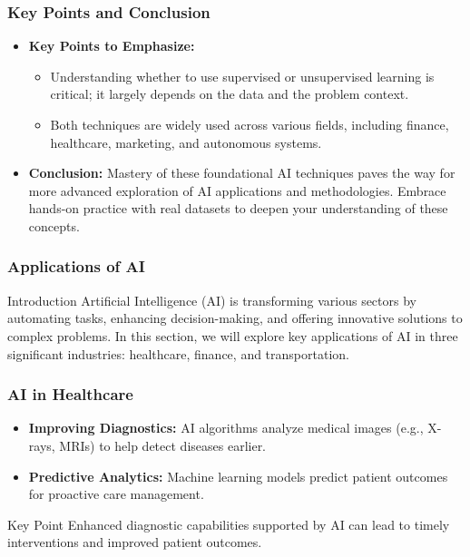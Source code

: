 \documentclass[aspectratio=169]{beamer}
\begin{document}
\begin{frame}[fragile]
    \frametitle{Key Points and Conclusion}
    \begin{itemize}
        \item \textbf{Key Points to Emphasize:}
        \begin{itemize}
            \item Understanding whether to use supervised or unsupervised learning is critical; it largely depends on the data and the problem context.
            \item Both techniques are widely used across various fields, including finance, healthcare, marketing, and autonomous systems.
        \end{itemize}
        
        \item \textbf{Conclusion:}
        Mastery of these foundational AI techniques paves the way for more advanced exploration of AI applications and methodologies. 
        Embrace hands-on practice with real datasets to deepen your understanding of these concepts.
    \end{itemize}
\end{frame}

\begin{frame}[fragile]
    \frametitle{Applications of AI}
    \begin{block}{Introduction}
        Artificial Intelligence (AI) is transforming various sectors by automating tasks, enhancing decision-making, and offering innovative solutions to complex problems. 
        In this section, we will explore key applications of AI in three significant industries: healthcare, finance, and transportation.
    \end{block}
\end{frame}

\begin{frame}[fragile]
    \frametitle{AI in Healthcare}
    \begin{itemize}
        \item \textbf{Improving Diagnostics:} AI algorithms analyze medical images (e.g., X-rays, MRIs) to help detect diseases earlier.
        \item \textbf{Predictive Analytics:} Machine learning models predict patient outcomes for proactive care management.
    \end{itemize}
    \begin{block}{Key Point}
        Enhanced diagnostic capabilities supported by AI can lead to timely interventions and improved patient outcomes.
    \end{block}
\end{frame}
\end{document}
